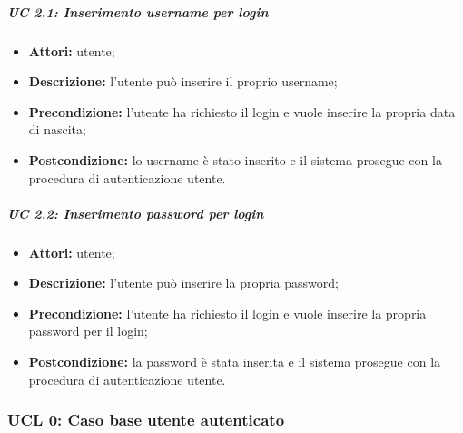 \subparagraph{UC 2.1: Inserimento username per login}
\begin{itemize}
\item \textbf{Attori:} utente;
\item \textbf{Descrizione:} l'utente può inserire il proprio username;
\item \textbf{Precondizione:} l'utente ha richiesto il login e vuole inserire la propria data di nascita;
\item \textbf{Postcondizione:} lo username è stato inserito e il sistema prosegue con la procedura di autenticazione utente.
\end{itemize}

\subparagraph{UC 2.2: Inserimento password per login}
\begin{itemize}
\item \textbf{Attori:} utente;
\item \textbf{Descrizione:} l'utente può inserire la propria password;
\item \textbf{Precondizione:} l'utente ha richiesto il login e vuole inserire la propria password per il login;
\item \textbf{Postcondizione:} la password è stata inserita e il sistema prosegue con la procedura di autenticazione utente.
\end{itemize}

\subsubsection{UCL 0: Caso base utente autenticato}

